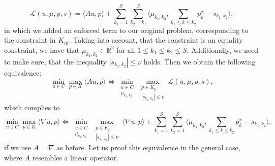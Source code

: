 \documentclass{scrreprt}
\begin{document}
            $$
                \mathcal{L}(u, \mu, p, s) = \langle Au, p \rangle + \sum_{k_{1} = 1}^{S} \sum_{k_{2} = k_{1}}^{S} \langle \mu_{k_{1}, k_{2}}, \sum_{k_{1} \le k \le k_{2}} p^{x}_{k} - s_{k_{1}, k_{2}} \rangle,
            $$
        in which we added an enforced term to our original problem, corresponding to the constraint in $K_{nl}$. Taking into account, that the constraint is an equality constraint, we have that $\mu_{k_{1}, k_{2}} \in \mathbb{R}^{2}$ for all $1 \le k_{1} \le k_{2} \le S$. Additionally, we need to make sure, that the inequality $|s_{k_{1}, k_{2}}| \le \nu$ holds. Then we obtain the following equivalence:
            $$
                \min_{u \in C} \max_{p \in K} \langle Au, p \rangle \Longleftrightarrow \min_{\substack{u \in C \\ \mu_{k_{1}, k_{2}}}} \max_{\substack{p \in K_{p} \\ |s_{k_{1}, k_{2}}| \le \nu}} \mathcal{L}(u, \mu, p, s),
            $$
        which complies to
            $$
                \min_{u \in C} \max_{p \in K} \langle \nabla u, p \rangle \Longleftrightarrow \min_{\substack{u \in C \\ \mu_{k_{1}, k_{2}}}} \max_{\substack{p \in K_{p} \\ |s_{k_{1}, k_{2}}| \le \nu}} \langle \nabla u, p \rangle + \sum_{k_{1} = 1}^{S} \sum_{k_{2} = 1}^{S} \langle \mu_{k_{1}, k_{2}}, \sum_{k_{1} \le k \le k_{2}} p^{x}_{k} - s_{k_{1}, k_{2}} \rangle,
            $$
        if we use $A = \nabla$ as before. Let us proof this equivalence in the general case, where $A$ resembles a linear operator.
\end{document}
